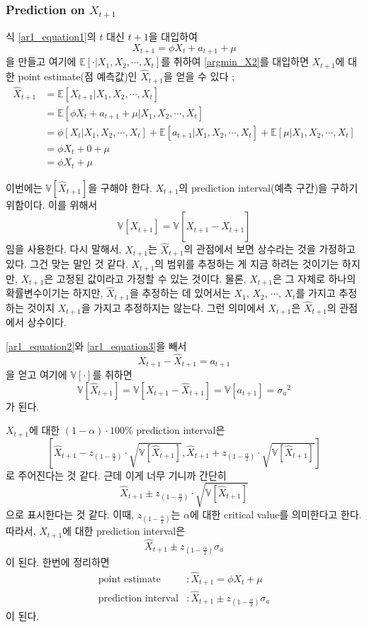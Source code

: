 \documentclass{article}
\newcommand\sa{\ensuremath{{\sigma_a}}}
\begin{document}
%
\subsubsection{Prediction on \(X_{t+1}\)}
식 \eqref{ar1_equation1}의 \(t\) 대신 \(t+1\)을 대입하여
\begin{equation}\label{ar1_equation2}
X_{t+1}=\phi X_t+a_{t+1}+\mu
\end{equation}
을 만들고 여기에 \(\mathbb E[\cdot|X_1,X_2,\cdots,X_t]\)를 취하여 \eqref{argmin_X2}를 대입하면 \(X_{t+1}\)에 대한 point estimate(점 예측값)인 \(\hat X_{t+1}\)을 얻을 수 있다 ;
\begin{equation}\label{ar1_equation3}
\begin{aligned}
\hat X_{t+1}
&=\mathbb E\left[X_{t+1}|X_1,X_2,\cdots,X_t\right]\\
&=\mathbb E\left[\phi X_t+a_{t+1}+\mu|X_1,X_2,\cdots,X_t\right]\\
&=\phi\left[X_t|X_1,X_2,\cdots,X_t\right]+\mathbb E\left[a_{t+1}|X_1,X_2,\cdots,X_t\right]+
\mathbb E\left[\mu|X_1,X_2,\cdots,X_t\right]\\
&=\phi X_t+0+\mu\\
&=\phi X_t+\mu
\end{aligned}
\end{equation}

이번에는 \(\mathbb V[\hat X_{t+1}]\)을 구해야 한다.
\(X_{t+1}\)의 prediction interval(예측 구간)을 구하기 위함이다.
이를 위해서
\[\mathbb V[X_{t+1}]=\mathbb V[\hat \hat X_{t+1}-X_{t+1}]\]
임을 사용한다.
다시 말해서, \(X_{t+1}\)는 \(\hat X_{t+1}\)의 관점에서 보면 상수라는 것을 가정하고 있다.
그건 맞는 말인 것 같다.
\(X_{t+1}\)의 범위를 추정하는 게 지금 하려는 것이기는 하지만, \(X_{t+1}\)은 고정된 값이라고 가정할 수 있는 것이다.
물론, \(X_{t+1}\)은 그 자체로 하나의 확률변수이기는 하지만, \(\hat X_{t+1}\)을 추정하는 데 있어서는 \(X_1\), \(X_2\), \(\cdots\), \(X_t\)를 가지고 추정하는 것이지 \(X_{t+1}\)을 가지고 추정하지는 않는다.
그런 의미에서 \(X_{t+1}\)은 \(\hat X_{t+1}\)의 관점에서 상수이다.

\eqref{ar1_equation2}와 \eqref{ar1_equation3}을 빼서
\[X_{t+1}-\hat X_{t+1}=a_{t+1}\]
을 얻고 여기에 \(\mathbb V[\cdot]\)를 취하면
\[\mathbb V[\hat X_{t+1}]=\mathbb V[X_{t+1}-\hat X_{t+1}]=\mathbb V[a_{t+1}]=\sa^2\]
가 된다.

\(X_{t+1}\)에 대한 \((1-\alpha)\cdot100\%\) prediction interval은
\[\left[\hat X_{t+1}-z_{(1-\frac\alpha2)}\cdot\sqrt{\mathbb V[\hat X_{t+1}]},
\hat X_{t+1}+z_{(1-\frac\alpha2)}\cdot\sqrt{\mathbb V[\hat X_{t+1}]}\right]\]
로 주어진다는 것 같다.
근데 이게 너무 기니까 간단히
\[\hat X_{t+1}\pm z_{(1-\frac\alpha2)}\cdot\sqrt{\mathbb V[\hat X_{t+1}]}\]
으로 표시한다는 것 같다.
이때, \(z_{(1-\frac\alpha2)}\)는 \(\alpha\)에 대한 critical value를 의미한다고 한다.
따라서, \(X_{t+1}\)에 대한 prediction interval은
\begin{equation}\label{ar1_equation4}
\hat X_{t+1}\pm z_{(1-\frac\alpha2)}\sa
\end{equation}
이 된다.
한번에 정리하면
\begin{align*}
\text{point estimate}		&:\hat X_{t+1} = \phi X_t+\mu\\
\text{prediction interval}	&:\hat X_{t+1}\pm z_{(1-\frac\alpha2)}\sa
\end{align*}
이 된다.
\end{document}
